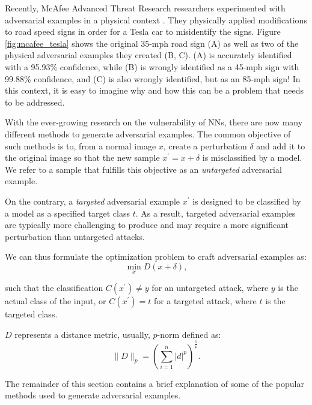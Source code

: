 Recently, McAfee Advanced Threat Research researchers experimented with
adversarial examples in a physical context \cite{noauthor_model_2020}. They
physically applied modifications to road speed signs in order for a Tesla car to
misidentify the signs. Figure \ref{fig:mcafee_tesla} shows the original 35-mph
road sign (A) as well as two of the physical adversarial examples they created
(B, C). (A) is accurately identified with a 95.93\% confidence, while (B) is
wrongly identified as a 45-mph sign with 99.88\% confidence, and (C) is also
wrongly identified, but as an 85-mph sign! In this context, it is easy to
imagine why and how this can be a problem that needs to be addressed.

With the ever-growing research on the vulnerability of NNs, there are now many
different methods to generate adversarial examples. The common objective of such
methods is to, from a normal image $x$, create a perturbation $\delta$ and add
it to the original image so that the new sample $x^{\prime}=x+\delta$ is
misclassified by a model. We refer to a sample that fulfills this objective as
an \textit{untargeted} adversarial example.

On the contrary, a \textit{targeted} adversarial example $x^{\prime}$ is
designed to be classified by a model as a specified target class $t$. As a
result, targeted adversarial examples are typically more challenging to produce
and may require a more significant perturbation than untargeted attacks.

We can thus formulate the optimization problem to craft adversarial examples as:
\begin{equation} \label{eq:adversarial_example_min}
    \min_{x}D(x+\delta),
\end{equation}


such that the classification $C(x^\prime)\neq{y}$ for an untargeted attack,
where $y$ is the actual class of the input, or $C(x^\prime)={t}$ for a targeted
attack, where $t$ is the targeted class.

$D$ represents a distance metric, usually, $p$-norm defined as:
\begin{equation} \label{eq:p-norm}
    \lVert D
    \lVert_{p}=\left(\sum_{i=1}^{n}|d|^{p}\right)^{\frac{1}{p}}.
\end{equation}

The remainder of this section contains a brief explanation of some of the
popular methods used to generate adversarial examples.

